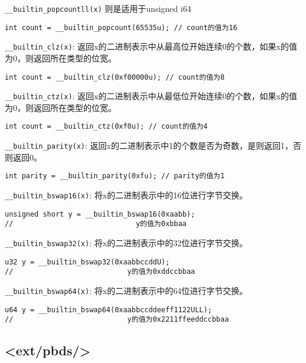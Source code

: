 \documentclass[a4paper,landscape,twocolumn]{ctexart}
\begin{document}
\texttt{\_\_builtin\_popcountll(x)} 则是适用于unsigned i64

\begin{lstlisting}
int count = __builtin_popcount(65535u); // count的值为16
\end{lstlisting}

\texttt{\_\_builtin\_clz(x)}: 返回x的二进制表示中从最高位开始连续0的个数，如果x的值为0，则返回所在类型的位宽。

\begin{lstlisting}
int count = __builtin_clz(0xf00000u); // count的值为8
\end{lstlisting}

\texttt{\_\_builtin\_ctz(x)}: 返回x的二进制表示中从最低位开始连续0的个数，如果x的值为0，则返回所在类型的位宽。

\begin{lstlisting}
int count = __builtin_ctz(0xf0u); // count的值为4
\end{lstlisting}

\texttt{\_\_builtin\_parity(x)}: 返回x的二进制表示中1的个数是否为奇数，是则返回1，否则返回0。

\begin{lstlisting}
int parity = __builtin_parity(0xfu); // parity的值为1
\end{lstlisting}

\texttt{\_\_builtin\_bswap16(x)}: 将x的二进制表示中的16位进行字节交换。
\begin{lstlisting}
unsigned short y = __builtin_bswap16(0xaabb);
//                             y的值为0xbbaa
\end{lstlisting}

\texttt{\_\_builtin\_bswap32(x)}: 将x的二进制表示中的32位进行字节交换。

\begin{lstlisting}
u32 y = __builtin_bswap32(0xaabbccddU);
//                           y的值为0xddccbbaa
\end{lstlisting}

\texttt{\_\_builtin\_bswap64(x)}: 将x的二进制表示中的64位进行字节交换。
\begin{lstlisting}
u64 y = __builtin_bswap64(0xaabbccddeeff1122ULL);
//                           y的值为0x2211ffeeddccbbaa
\end{lstlisting}

\subsection{<ext/pbds/>}
\end{document}
